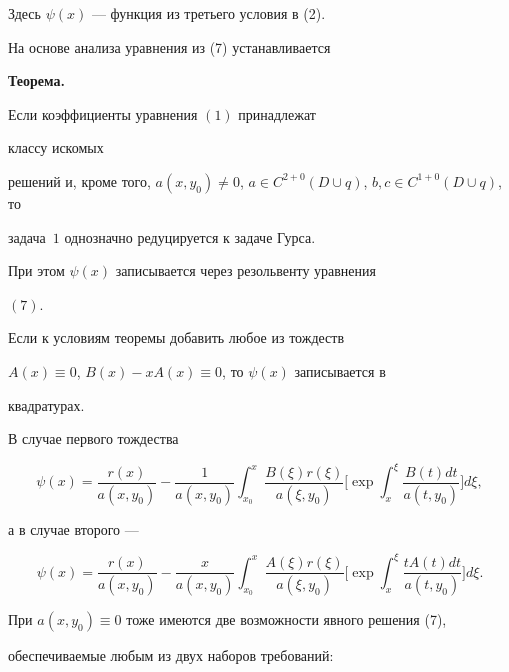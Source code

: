 Здесь $\psi(x)$ --- функция из третьего условия в (2).


На основе анализа уравнения из (7) устанавливается 


\medskip 


 


{\bf Теорема.} {\it


Если коэффициенты уравнения $(1)$ принадлежат 


классу искомых 


решений и, кроме того, $a(x,y_0)\ne0$, $a\in C^{2+0}(D\cup q)$, $b,c\in 


C^{1+0}(D\cup q)$, то 


задача~$1$ однозначно редуцируется к задаче Гурса. 


При этом $\psi(x)$ записывается через резольвенту уравнения 


$(7)$. 


}


\medskip


 


Если к условиям теоремы добавить любое из тождеств 


$A(x)\equiv0$, $B(x)-x A(x)\equiv0$, то $\psi(x)$ записывается в 


квадратурах. 


 


В случае первого тождества 


$$ 


\psi(x)=\frac{r(x)}{a(x,y_0)}-\frac{1}{a(x,y_0)} 


\int^x_{x_0}\frac{B(\xi)r(\xi)}{a(\xi,y_0)}\bigg[\exp 


\int^\xi_x\frac{B(t)dt}{a(t,y_0)}\bigg]d\xi, 


$$ 


а в случае второго --- 


$$ 


\psi(x)=\frac{r(x)}{a(x,y_0)}-\frac{x}{a(x,y_0)} 


\int^x_{x_0}\frac{A(\xi)r(\xi)}{a(\xi,y_0)}\bigg[\exp 


\int^\xi_x\frac{t A(t)dt}{a(t,y_0)}\bigg]d\xi. 


$$ 


 


При $a(x,y_0)\equiv0$ тоже имеются две возможности явного решения (7),  


обеспечиваемые любым из двух наборов требований: 


